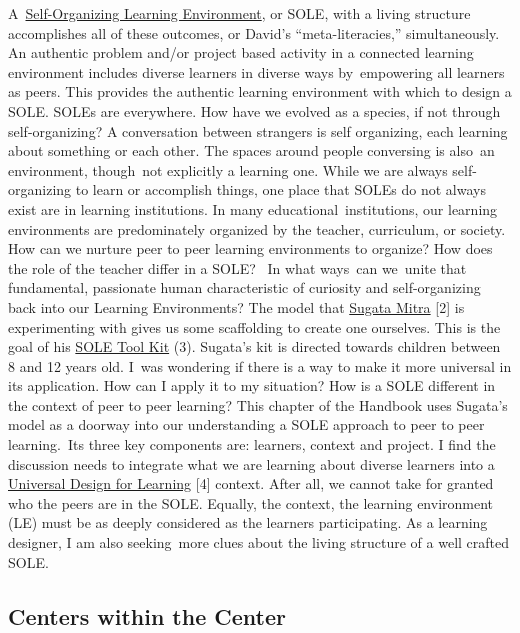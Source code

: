A~\href{http://en.wikipedia.org/wiki/Self_Organised_Learning_Environment}{Self-Organizing
Learning Environment}, or SOLE, with a living structure accomplishes all
of these outcomes, or David's ``meta-literacies,'' simultaneously. An
authentic problem and/or project based activity in a connected learning
environment includes diverse learners in diverse ways by~empowering all
learners as peers. This provides the authentic learning environment with
which to design a SOLE. SOLEs are everywhere. How have we evolved as a
species, if not through self-organizing? A conversation between
strangers is self organizing, each learning about something or each
other. The spaces around people conversing is also~an environment,
though~not explicitly a learning one. While we are always
self-organizing to learn or accomplish things, one place that SOLEs do
not always exist are in learning institutions. In many
educational~institutions, our learning environments are predominately
organized by the teacher, curriculum, or society. How can we nurture
peer to peer learning environments to organize? How does the role of the
teacher differ in a SOLE?~ In what ways~can we~unite that fundamental,
passionate human characteristic of curiosity and self-organizing back
into our Learning Environments? The model that
\href{http://sugatam.wikispaces.com/}{Sugata Mitra} {[}2{]} is
experimenting with gives us some scaffolding to create one ourselves.
This is the goal of his
\href{http://www.ted.com/pages/sole_toolkit}{SOLE Tool Kit} (3).
Sugata's kit is directed towards children between 8 and 12 years old.
I~was wondering if there is a way to make it more universal in its
application. How can I apply it to my situation? How is a SOLE different
in the context of peer to peer learning? This chapter of the Handbook
uses Sugata's model as a doorway into our understanding a SOLE approach
to peer to peer learning.~Its three key components are: learners,
context and project. I find the discussion needs to integrate what we
are learning about diverse learners into a
\href{http://www.udlcenter.org/aboutudl/udlguidelines}{Universal Design
for Learning} {[}4{]} context. After all, we cannot take for granted who
the peers are in the SOLE. Equally, the context, the learning
environment (LE) must be as deeply considered as the learners
participating. As a learning designer, I am also seeking~more clues
about the living structure of a well crafted SOLE.

\subsection{Centers within the Center}

